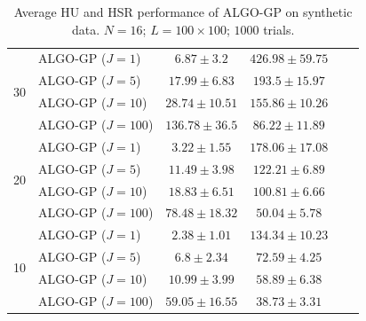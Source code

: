 \begin{table}[h]
\begin{adjustbox}{max width=\textwidth}
\begin{tabular}{|c|l|c|c|c|c|}
\multirow{4}{*}{30} & ALGO-GP ($J=1$)            & $6.87     \pm 3.2$    & $426.98   \pm 59.75$  \tabularnewline
                    & ALGO-GP ($J=5$)            & $17.99    \pm 6.83$   & $193.5    \pm 15.97$  \tabularnewline
                    & ALGO-GP ($J=10$)           & $28.74    \pm 10.51$  & $155.86   \pm 10.26$  \tabularnewline
                    & ALGO-GP ($J=100$)          & $136.78   \pm 36.5$   & $86.22    \pm 11.89$  \tabularnewline \cline{1-4}
\multirow{4}{*}{20} & ALGO-GP ($J=1$)            & $3.22     \pm 1.55$   & $178.06   \pm 17.08$  \tabularnewline
                    & ALGO-GP ($J=5$)            & $11.49    \pm 3.98$   & $122.21   \pm 6.89$   \tabularnewline
                    & ALGO-GP ($J=10$)           & $18.83    \pm 6.51$   & $100.81   \pm 6.66$   \tabularnewline
                    & ALGO-GP ($J=100$)          & $78.48    \pm 18.32$  & $50.04    \pm 5.78$   \tabularnewline \cline{1-4}
\multirow{4}{*}{10} & ALGO-GP ($J=1$)            & $2.38     \pm 1.01$   & $134.34   \pm 10.23$  \tabularnewline
                    & ALGO-GP ($J=5$)            & $6.8      \pm 2.34$   & $72.59    \pm 4.25$   \tabularnewline
                    & ALGO-GP ($J=10$)           & $10.99    \pm 3.99$   & $58.89    \pm 6.38$   \tabularnewline
                    & ALGO-GP ($J=100$)          & $59.05    \pm 16.55$  & $38.73    \pm 3.31$   \tabularnewline \cline{1-4}
\end{tabular}
\end{adjustbox}
\caption{Average HU and HSR performance of ALGO-GP on synthetic data.
         $N = 16$; $L = 100 \times 100$; $1000$ trials.}
\label{table:results_full_GP_MO16}
\end{table}

\newpage

